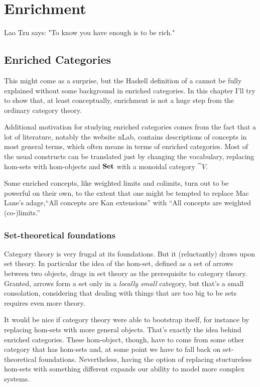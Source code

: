 \documentclass[DaoFP]{subfiles}
\begin{document}
\setcounter{chapter}{20}

\chapter{Enrichment}

Lao Tzu says: "To know you have enough is to be rich." 

\section{Enriched Categories}

This might come as a surprise, but the Haskell definition of a  cannot be fully explained without some background in enriched categories. In this chapter I'll try to show that, at least conceptually, enrichment is not a huge step from the ordinary category theory. 

Additional motivation for studying enriched categories comes from the fact that a lot of literature, notably the website nLab, contains descriptions of concepts in most general terms, which often means in terms of enriched categories. Most of the usual constructs can be translated just by changing the vocabulary, replacing hom-sets with hom-objects and $\mathbf{Set}$ with a monoidal category $\cat V$. 

Some enriched concepts, like weighted limits and colimits, turn out to be powerful on their own, to the extent that one might be tempted to replace Mac Lane's adage,``All concepts are Kan extensions'' with ``All concepts are weighted (co-)limits.''

\subsection{Set-theoretical foundations}

Category theory is very frugal at its foundations. But it (reluctantly) draws upon set theory. In particular the idea of the hom-set, defined as a set of arrows between two objects, drags in set theory as the prerequisite to category theory. Granted, arrows form a set only in a \emph{locally small} category, but that's a small consolation, considering that dealing with things that are too big to be sets requires even more theory. 

It would be nice if category theory were able to bootstrap itself, for instance by replacing hom-sets with more general objects. That's exactly the idea behind enriched categories. These hom-object, though, have to come from some other category that has hom-sets and, at some point we have to fall back on set-theoretical foundations. Nevertheless, having the option of replacing stuctureless hom-sets with something different expands our ability to model more complex systems.
\end{document}
